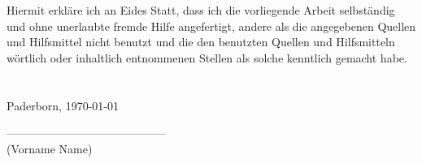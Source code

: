 \noindent
Hiermit erkläre ich an Eides Statt, dass ich die vorliegende Arbeit selbständig und ohne unerlaubte fremde Hilfe angefertigt, andere als die angegebenen Quellen und Hilfsmittel nicht benutzt und die den benutzten Quellen und Hilfsmitteln wörtlich oder inhaltlich entnommenen Stellen als solche kenntlich gemacht habe.\\
\\
\\
Paderborn, \today
\begin{flushright}
------------------------------------------\\
(Vorname Name)
\end{flushright}